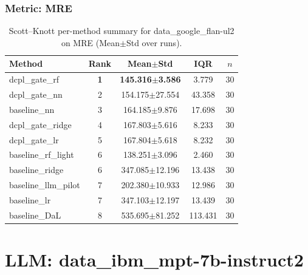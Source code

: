 \subsubsection*{Metric: MRE}
\begin{table}[H]
\centering
\scriptsize
\setlength{\tabcolsep}{4pt}
\renewcommand{\arraystretch}{1.1}
\caption{Scott--Knott per-method summary for data\_google\_flan-ul2 on MRE (Mean$\pm$Std over runs).}
\label{tab:sk_data_google_flan-ul2_MRE}
\begin{tabular}{l|c|c|c|c}
\hline
\textbf{Method} & \textbf{Rank} & \textbf{Mean$\pm$Std} & \textbf{IQR} & \textbf{$n$} \\
\hline
\rowcolor{red!15} dcpl\_gate\_rf & \textbf{1} & \textbf{145.316$\pm$3.586} & 3.779 & 30 \\
dcpl\_gate\_nn & 2 & 154.175$\pm$27.554 & 43.358 & 30 \\
baseline\_nn & 3 & 164.185$\pm$9.876 & 17.698 & 30 \\
dcpl\_gate\_ridge & 4 & 167.803$\pm$5.616 & 8.233 & 30 \\
dcpl\_gate\_lr & 5 & 167.804$\pm$5.618 & 8.232 & 30 \\
baseline\_rf\_light & 6 & 138.251$\pm$3.096 & 2.460 & 30 \\
baseline\_ridge & 6 & 347.085$\pm$12.196 & 13.438 & 30 \\
baseline\_llm\_pilot & 7 & 202.380$\pm$10.933 & 12.986 & 30 \\
baseline\_lr & 7 & 347.103$\pm$12.197 & 13.439 & 30 \\
baseline\_DaL & 8 & 535.695$\pm$81.252 & 113.431 & 30 \\
\hline
\end{tabular}
\end{table}


\newpage

\section*{LLM: data\_ibm\_mpt-7b-instruct2}


